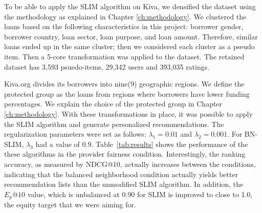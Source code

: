 To be able to apply the SLIM algorithm on Kiva, we densified the dataset using the methodology as explained in Chapter \ref{ch:methodology}. We clustered the loans based on the following characteristics in this project: borrower gender, borrower country, loan sector, loan purpose, and loan amount. Therefore, similar loans ended up in the same cluster; then we considered each cluster as a pseudo item. Then a 5-core transformation was applied to the dataset. The retained dataset has 3,593 psuedo-items, 29,342 users and 393,035 ratings.



Kiva.org divides its borrowers into nine(9) geographic regions. We define the protected group as the loans from regions where borrowers have lower funding percentages. We explain the choice of the protected group in Chapter \ref{ch:methodology}. With these transformations in place, it was possible to apply the SLIM algorithm and generate personalized recommendations. The regularization parameters were set as follows: $\lambda_1 = 0.01$ and $\lambda_2 = 0.001$. For BN-SLIM, $\lambda_3$ had a value of 0.9. Table~\ref{tab:results} shows the performance of the these algorithms in the provider fairness condition. Interestingly, the ranking accuracy, as measured by NDCG@10, actually increases between the conditions, indicating that the balanced neighborhood condition actually yields better recommendation lists than the unmodified SLIM algorithm. In addition, the $E_p@10$ value, which is unbalanced at 0.90 for SLIM is improved to close to 1.0, the equity target that we were aiming for.




